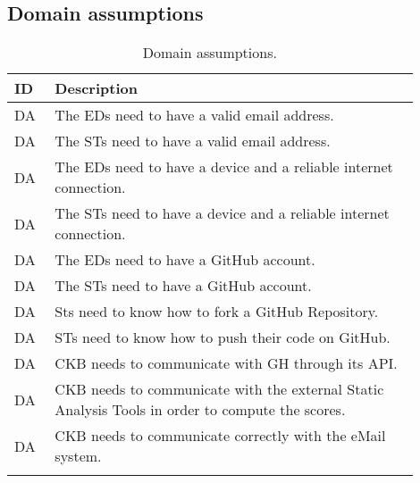 \subsection{Domain assumptions}
\label{subsec:domain_assumptions}%
\setcounter{da}{1}
\newcommand{\cda}{\theda\stepcounter{da}}
\begin{center}
    \begin{longtable}{ |l|p{0.9\linewidth}| }
        \hline
        \textbf{ID} & \textbf{Description} \\
        \hline
        DA\cda      & The EDs need to have a valid email address. \\
        \hline
        DA\cda      &  The STs need to have a valid email address. \\
        \hline
        DA\cda      & The EDs need to have a device and a reliable internet connection. \\
        \hline
        DA\cda      & The STs need to have a device and a reliable internet connection. \\
        \hline
        DA\cda      & The EDs need to have a GitHub account. \\
        \hline
        DA\cda      & The STs need to have a GitHub account. \\
        \hline
        DA\cda      & Sts need to know how to fork a GitHub Repository. \\
        \hline
        DA\cda      & STs need to know how to push their code on GitHub. \\
        \hline
        DA\cda      & CKB needs to communicate with GH through its API. \\
        \hline
        DA\cda      & CKB needs to communicate with the external Static Analysis Tools in order to compute the scores. \\
        \hline
        DA\cda      & CKB needs to communicate correctly with the eMail system. \\
        \hline
        \caption{Domain assumptions.}
        \label{tab:domainassmptn_tab}%
    \end{longtable}
\end{center}